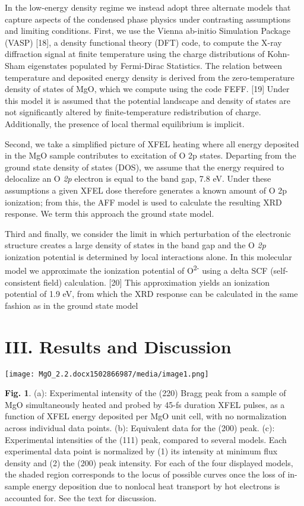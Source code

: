 In the low-energy density regime we instead adopt three alternate models
that capture aspects of the condensed phase physics under contrasting
assumptions and limiting conditions. First, we use the Vienna ab-initio
Simulation Package (VASP) {[}18{]}, a density functional theory (DFT)
code, to compute the X-ray diffraction signal at finite temperature
using the charge distributions of Kohn-Sham eigenstates populated by
Fermi-Dirac Statistics. The relation between temperature and deposited
energy density is derived from the zero-temperature density of states of
MgO, which we compute using the code FEFF. {[}19{]} Under this model it
is assumed that the potential landscape and density of states are not
significantly altered by finite-temperature redistribution of charge.
Additionally, the presence of local thermal equilibrium is implicit.

Second, we take a simplified picture of XFEL heating where all energy
deposited in the MgO sample contributes to excitation of O 2p states.
Departing from the ground state density of states (DOS), we assume that
the energy required to delocalize an O \emph{2p} electron is equal to
the band gap, 7.8 eV. Under these assumptions a given XFEL dose
therefore generates a known amount of O 2p ionization; from this, the
AFF model is used to calculate the resulting XRD response. We term this
approach the ground state model.

Third and finally, we consider the limit in which perturbation of the
electronic structure creates a large density of states in the band gap
and the O \emph{2p} ionization potential is determined by local
interactions alone. In this molecular model we approximate the
ionization potential of O\textsuperscript{2-} using a delta SCF
(self-consistent field) calculation. {[}20{]} This approximation yields
an ionization potential of 1.9 eV, from which the XRD response can be
calculated in the same fashion as in the ground state model

\section{III. Results and Discussion}

\begin{center}
\texttt{[image: MgO\_2.2.docx1502866987/media/image1.png]}
\end{center}
\textbf{Fig. 1}. (a): Experimental intensity of the (220) Bragg peak
from a sample of MgO simultaneously heated and probed by 45-fs duration
XFEL pulses, as a function of XFEL energy deposited per MgO unit cell,
with no normalization across individual data points. (b): Equivalent
data for the (200) peak. (c): Experimental intensities of the (111)
peak, compared to several models. Each experimental data point is
normalized by (1) its intensity at minimum flux density and (2) the
(200) peak intensity. For each of the four displayed models, the shaded
region corresponds to the locus of possible curves once the loss of
in-sample energy deposition due to nonlocal heat transport by hot
electrons is accounted for. See the text for discussion.
\bigbreak

